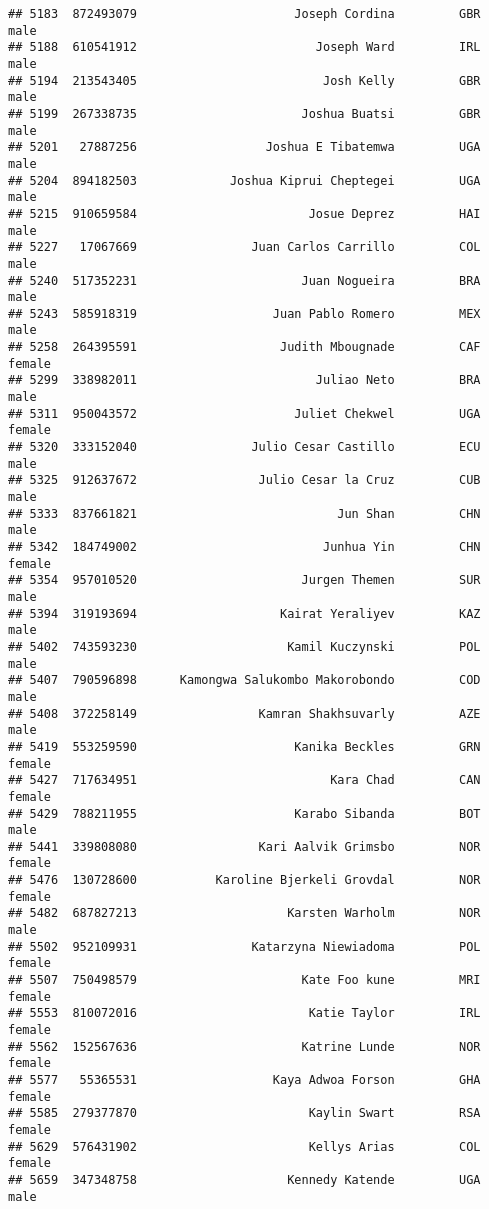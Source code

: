 \documentclass[]{article}
\begin{document}
\begin{verbatim}
## 5183  872493079                      Joseph Cordina         GBR   male
## 5188  610541912                         Joseph Ward         IRL   male
## 5194  213543405                          Josh Kelly         GBR   male
## 5199  267338735                       Joshua Buatsi         GBR   male
## 5201   27887256                  Joshua E Tibatemwa         UGA   male
## 5204  894182503             Joshua Kiprui Cheptegei         UGA   male
## 5215  910659584                        Josue Deprez         HAI   male
## 5227   17067669                Juan Carlos Carrillo         COL   male
## 5240  517352231                       Juan Nogueira         BRA   male
## 5243  585918319                   Juan Pablo Romero         MEX   male
## 5258  264395591                    Judith Mbougnade         CAF female
## 5299  338982011                         Juliao Neto         BRA   male
## 5311  950043572                      Juliet Chekwel         UGA female
## 5320  333152040                Julio Cesar Castillo         ECU   male
## 5325  912637672                 Julio Cesar la Cruz         CUB   male
## 5333  837661821                            Jun Shan         CHN   male
## 5342  184749002                          Junhua Yin         CHN female
## 5354  957010520                       Jurgen Themen         SUR   male
## 5394  319193694                    Kairat Yeraliyev         KAZ   male
## 5402  743593230                     Kamil Kuczynski         POL   male
## 5407  790596898      Kamongwa Salukombo Makorobondo         COD   male
## 5408  372258149                 Kamran Shakhsuvarly         AZE   male
## 5419  553259590                      Kanika Beckles         GRN female
## 5427  717634951                           Kara Chad         CAN female
## 5429  788211955                      Karabo Sibanda         BOT   male
## 5441  339808080                 Kari Aalvik Grimsbo         NOR female
## 5476  130728600           Karoline Bjerkeli Grovdal         NOR female
## 5482  687827213                     Karsten Warholm         NOR   male
## 5502  952109931                Katarzyna Niewiadoma         POL female
## 5507  750498579                       Kate Foo kune         MRI female
## 5553  810072016                        Katie Taylor         IRL female
## 5562  152567636                       Katrine Lunde         NOR female
## 5577   55365531                   Kaya Adwoa Forson         GHA female
## 5585  279377870                        Kaylin Swart         RSA female
## 5629  576431902                        Kellys Arias         COL female
## 5659  347348758                     Kennedy Katende         UGA   male

\end{verbatim}
\end{document}
